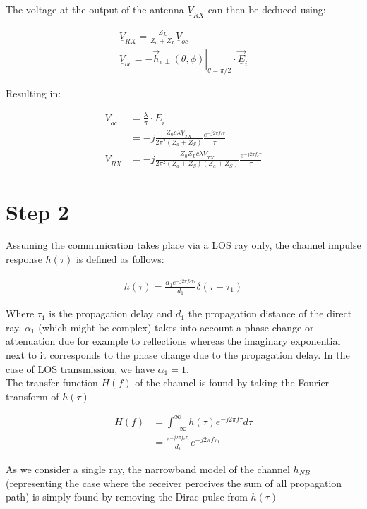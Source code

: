 \documentclass[10pt,a4paper]{ULBreport}
\begin{document}
The voltage at the output of the antenna $\underline{V}_{RX}$ can then be deduced using:

\begin{align*}
    \underline{V}_{RX} = \frac{Z_L}{Z_a + Z_L} \underline{V}_{oc}\\
    \underline{V}_{oc} = -\left . \vec{h}_{e\perp}(\theta, \phi)\right\vert_{\theta = \pi/2} \cdot \underline{\vec{E}}_i
\end{align*}

Resulting in:

\begin{align*}
    \underline{V}_{oc} &= \frac{\lambda}{\pi} \cdot \underline{E}_i\\
    &= -j\frac{Z_0 c \lambda \underline{V}_{TX}}{2\pi^2 (Z_a + Z_S)}\frac{e^{-j 2\pi f_c \tau}}{\tau}\\
    \underline{V}_{RX} &= -j\frac{Z_0 Z_L c \lambda \underline{V}_{TX}}{2\pi^2 (Z_a + Z_S) (Z_a+Z_S)}\frac{e^{-j 2\pi f_c \tau}}{\tau}
\end{align*}

\section{Step 2}

Assuming the communication takes place via a LOS ray only, the channel impulse response $h(\tau)$ is defined as follows:

\begin{align*}
    h(\tau) = \frac{\alpha_1 e^{-j2\pi f_c \tau_1}}{d_1} \delta(\tau - \tau_1)
\end{align*}

Where $\tau_1$ is the propagation delay and $d_1$ the propagation distance of the direct ray. $\alpha_1$ (which might be complex) takes into account a phase change or attenuation due for example to reflections whereas the imaginary exponential next to it corresponds to the phase change due to the propagation delay. In the case of LOS transmission, we have $\alpha_1 = 1$.\\
The transfer function $H(f)$ of the channel is found by taking the Fourier transform of $h(\tau)$

\begin{align*}
    H(f) &= \int_{-\infty}^{\infty} h(\tau) e^{-j2\pi f \tau} d\tau\\
    &= \frac{e^{-j2\pi f_c \tau_1}}{d_1}e^{-j2\pi f \tau_1}
\end{align*}

As we consider a single ray, the narrowband model of the channel $h_{NB}$ (representing the case where the receiver perceives the sum of all propagation path) is simply found by removing the Dirac pulse from $h(\tau)$
\end{document}

